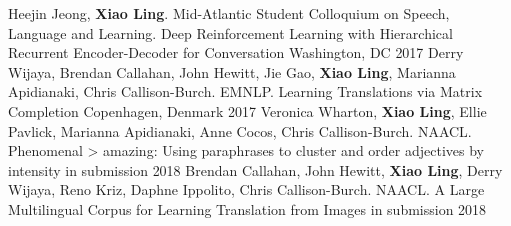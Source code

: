 
\begin{cventries}
  \cventrypublication
    {Heejin Jeong, \textbf{Xiao Ling}.  Mid-Atlantic Student Colloquium on Speech, Language and Learning.}
    {Deep Reinforcement Learning with Hierarchical Recurrent Encoder-Decoder for Conversation}
    {Washington, DC}
    {2017}
    {}
  \cventrypublication
    {Derry Wijaya, Brendan Callahan, John Hewitt, Jie Gao, \textbf{Xiao Ling}, Marianna Apidianaki, Chris Callison-Burch. EMNLP.}
    {Learning Translations via Matrix Completion}
    {Copenhagen, Denmark}
    {2017}
    {}
  \cventrypublication
    {Veronica Wharton, \textbf{Xiao Ling}, Ellie Pavlick, Marianna Apidianaki, Anne Cocos, Chris Callison-Burch. NAACL.}
    {Phenomenal > amazing: Using paraphrases to cluster and order adjectives by intensity}
    {in submission}
    {2018}
    {}
  \cventrypublication
    {Brendan Callahan, John Hewitt, \textbf{Xiao Ling}, Derry Wijaya, Reno Kriz, Daphne Ippolito,  Chris Callison-Burch. NAACL.}
    {A Large Multilingual Corpus for Learning Translation from Images}
    {in submission}
    {2018}
    {}
\end{cventries}



